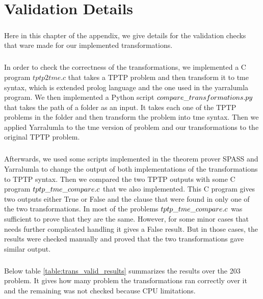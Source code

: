 \chapter{Validation Details}\label{chap:appendix_valid}
\paragraph{}
Here in this chapter of the appendix, we give details for the validation checks that ware made for our implemented transformations.

\paragraph{}
In order to check the correctness of the transformations, we implemented a C program $tptp2tme.c$ that takes a TPTP problem and then transform it to tme syntax, which is extended prolog language and the one used in the yarralumla program. We then implemented a Python script $compare\char`_transformations.py$ that takes the path of a folder as an input. It takes each one of the TPTP problems in the folder and then transform the problem into tme syntax. Then we applied Yarralumla to the tme version of problem and our transformations to the original TPTP problem. 

\paragraph{}
Afterwards, we used some scripts implemented in the theorem prover SPASS and Yarralumla to change the output of both implementations of the transformations to TPTP syntax. Then we compared the two TPTP outputs with some C program $tptp\char`_tme\char`_compare.c$ that we also implemented. This C program gives two outputs either True or False and the clause that were found in only one of the two transformations. In most of the problems $tptp\char`_tme\char`_compare.c$ was sufficient to prove that they are the same. However, for some minor cases that needs further complicated handling it gives a False result. But in those cases, the results were checked manually and proved that the two transformations gave similar output.

\paragraph{}
Below table \ref{table:trans_valid_results} summarizes the results over the 203 problem. It gives how many problem the transformations ran correctly over it and the remaining was not checked because CPU limitations.

